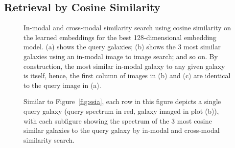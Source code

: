 \subsection{Retrieval by Cosine Similarity}\label{subsec:results-retrieval}
\begin{figure}[t]
    \centering
    \caption{In-modal and cross-modal similarity search using cosine similarity on the learned embeddings for the
        best 128-dimensional embedding model.
        (a) shows the query galaxies; (b) shows the 3 most similar galaxies using an in-modal image to image search; and
        so on.
        By construction, the most similar in-modal galaxy to any given galaxy is itself, hence, the first column of images
        in (b) and (c) are identical to the query image in (a).}
    \label{fig:ssia}
\end{figure}

\begin{figure}[t]
    \centering
    \caption{Similar to Figure~\eqref{fig:ssia}, each row in this figure depicts a single query galaxy (query spectrum in red,
        galaxy imaged in plot (b)), with each subfigure showing the spectrum of the 3 most cosine similar galaxies to the
        query galaxy by in-modal and cross-modal similarity search.}
    \label{fig:sss}
\end{figure}

